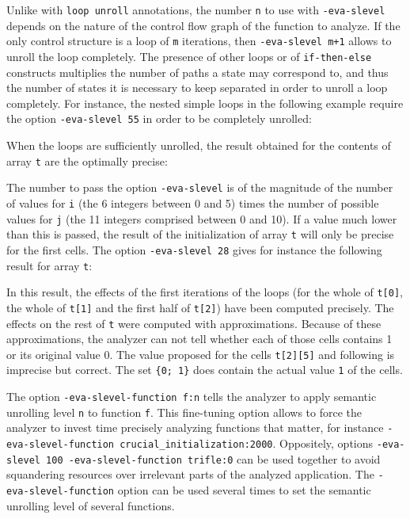 \documentclass{frama-c-book}
\begin{document}
Unlike with \lstinline|loop unroll| annotations, the number \lstinline|n|
to use with \lstinline|-eva-slevel| depends on the nature of the control flow
graph of the function to analyze.
If the only control structure is a loop of \lstinline|m| iterations,
then \texttt{-eva-slevel \textsf{m+1}} allows to unroll the loop completely.
The presence of other loops or of \lstinline|if-then-else| constructs
multiplies the number of paths a state may correspond to,
and thus the number of states it is necessary to keep separated
in order to unroll a loop completely.
For instance, the
nested simple loops in the following example require the
option \lstinline|-eva-slevel 55| in order to be completely unrolled:

When the loops are sufficiently unrolled, the result obtained for the
contents of array \lstinline|t| are the optimally precise:

The number to pass the option \lstinline|-eva-slevel|  is of the magnitude of
the number of values for \lstinline|i| (the 6 integers between 0 and 5)
times the number of possible values for \lstinline|j| (the 11
integers comprised between 0 and 10). If a value much lower than
this is passed, the result of the initialization of array \lstinline|t|
will only be precise for the first cells. The option \lstinline|-eva-slevel 28|
gives for instance the following result for array \lstinline|t|:

In this result, the effects of the first iterations of the loops
(for the whole of \lstinline|t[0]|, the whole of \lstinline|t[1]| and the first
half of \lstinline|t[2]|) have been computed precisely. The
effects on the rest of \lstinline|t| were computed with
approximations. Because of these approximations, the analyzer can not
tell whether each of those cells contains 1 or its original value 0.
The value proposed for the cells \lstinline|t[2][5]| and following
is imprecise but correct. The set \lstinline|{0; 1}| does
contain the actual value \lstinline|1| of the cells.

The option \lstinline|-eva-slevel-function f:n| tells the analyzer to apply
semantic unrolling level \lstinline|n| to function \lstinline|f|.
This fine-tuning option allows to
force the analyzer to invest time precisely analyzing functions that matter,
for instance \lstinline|-eva-slevel-function crucial_initialization:2000|.
Oppositely, options \lstinline|-eva-slevel 100 -eva-slevel-function trifle:0|
can be used together to avoid squandering resources over irrelevant parts of
the analyzed application. The \lstinline|-eva-slevel-function| option can be used
several times to set the semantic unrolling level of several functions.
\end{document}
